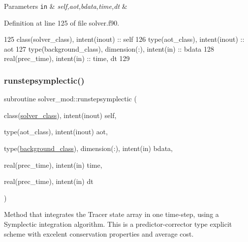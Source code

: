 \begin{DoxyParams}[1]{Parameters}
\mbox{\tt in}  & {\em self,aot,bdata,time,dt} & \\
\hline
\end{DoxyParams}


Definition at line 125 of file solver.\+f90.


\begin{DoxyCode}
125     \textcolor{keywordtype}{class}(solver\_class), \textcolor{keywordtype}{intent(inout)} :: self
126     \textcolor{keywordtype}{type}(aot\_class), \textcolor{keywordtype}{intent(inout)} :: aot
127     \textcolor{keywordtype}{type}(background\_class), \textcolor{keywordtype}{dimension(:)}, \textcolor{keywordtype}{intent(in)} :: bdata
128     \textcolor{keywordtype}{real(prec\_time)}, \textcolor{keywordtype}{intent(in)} :: time, dt
129 
\end{DoxyCode}
\mbox{\label{namespacesolver__mod_a91ddfd70d0f6d65b00fe6b08f4113cd6}} 
\subsubsection{\texorpdfstring{runstepsymplectic()}{runstepsymplectic()}}
{\footnotesize\ttfamily subroutine solver\+\_\+mod\+::runstepsymplectic (\begin{DoxyParamCaption}\item[{class(\mbox{\hyperlink{structsolver__mod_1_1solver__class}{solver\+\_\+class}}), intent(inout)}]{self,  }\item[{type(aot\+\_\+class), intent(inout)}]{aot,  }\item[{type(\mbox{\hyperlink{structbackground__mod_1_1background__class}{background\+\_\+class}}), dimension(\+:), intent(in)}]{bdata,  }\item[{real(prec\+\_\+time), intent(in)}]{time,  }\item[{real(prec\+\_\+time), intent(in)}]{dt }\end{DoxyParamCaption})\hspace{0.3cm}{\ttfamily [private]}}



Method that integrates the Tracer state array in one time-\/step, using a Symplectic integration algorithm. This is a predictor-\/corrector type explicit scheme with excelent conservation properties and average cost. 

